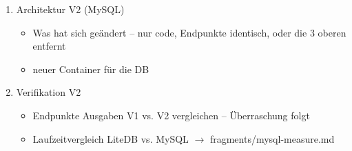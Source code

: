 {\begin{enumerate}
\begin{itemize}
                \item conclusio geht es schneller mit einer relationalen Datenbank?
            \end{itemize}
            \item Architektur V2 (MySQL)
            \begin{itemize}
                \item Was hat sich geändert -- nur code, Endpunkte identisch, oder die 3 oberen entfernt
                \item neuer Container für die DB
            \end{itemize}
            \item Verifikation V2
            \begin{itemize}
                \item Endpunkte Ausgaben V1 vs. V2 vergleichen -- Überraschung folgt
                \item Laufzeitvergleich LiteDB vs. MySQL $\rightarrow$ fragments/mysql-measure.md
            \end{itemize}
        \end{enumerate}
    }
